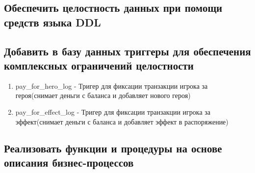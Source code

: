 

\subsection*{Обеспечить целостность данных при помощи средств языка DDL}



\subsection*{Добавить в базу данных триггеры для обеспечения комплексных ограничений
целостности}


\begin{enumerate}
    \item pay\_for\_hero\_log 
    - Тригер для фиксации транзакции игрока за героя(снимает деньги с баланса и добавляет нового героя)

    \item pay\_for\_effect\_log
    - Тригер для фиксации транзакции игрока за эффект(снимает деньги с баланса и добавляет эффект в распоряжение)
\end{enumerate}


\subsection*{Реализовать функции и процедуры на основе описания бизнес-процессов}


